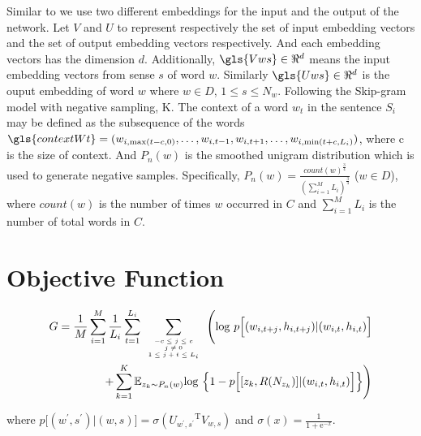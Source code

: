 Similar to \cite{MikolovSutskeverEtAl2013} we use two different embeddings for the input and the output of the network.
Let $V$ and $U$ to represent respectively the set of input embedding vectors and the set of output embedding vectors respectively. And each embedding vectors has the dimension $d$. Additionally, $\gls{Vws} \in \Re^d$ %
means the input embedding vectors from sense $s$ of word $w$. Similarly
$\gls{Uws} \in \Re^d$ %
is the ouput embedding of word $w$ where  $w\in D$, $1\leq s\leq N_w$. Following the Skip-gram model with negative sampling, \gls{K}. %
The context  of a word $w_t$ in the sentence $S_i$ may be defined as the subsequence of the words  
$\gls{contextWt} = (w_{i,\max(t-c,0)},\ldots,w_{i,t-1},w_{i,t+1},\ldots,w_{i,\min(t+c,L_i)})$,  
where \gls{c} %
is the size of context. And $P_n(w)$ 
is the smoothed unigram distribution which is used to generate negative samples. Specifically, $P_n(w) = \frac{count(w)^{\frac{3}{4}}}{(\sum_{i=1}^M L_i)^{\frac{3}{4}}}$ ($w\in D$), where $count(w)$ is the number of times $w$ occurred in $C$ and $\sum_{i=1}^M L_i$ is the number of total words in $C$.

\section{Objective Function}

\begin{equation}
\begin{split}
G = \frac{1}{M}\sum_{i=1}^M\frac{1}{L_i}\sum_{t=1}^{L_i}\sum\limits_{\mbox{\tiny$\begin{array}{c}-c\leq j \leq c\\ j\neq 0\\ 1\leq j+t\leq L_i\end{array}$}}\Bigg (\mathrm{log}\ p\Big [(w_{i,t+j},h_{i,t+j})|(w_{i,t},h_{i,t})\Big ] \\
+\sum\limits_{k=1}^K\mathbb{E}_{z_k\sim P_n(w)}\mathrm{log}\ \Big \{1-p\Big[[z_k,R(N_{z_k})]|(w_{i,t},h_{i,t})\Big ] \Big \} \Bigg )
\end{split}
\end{equation} 

where $p\Big[(w^\prime,s^\prime)|(w,s)\Big] = \sigma({U_{w^\prime,s^\prime}}^{\mathrm{T}}V_{w,s})$
 and $\sigma(x) = \frac{1}{1+\mathrm{e}^{-x}}$. 
 

